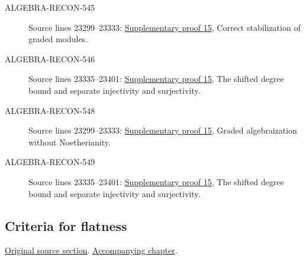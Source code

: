 \begin{description}
\item[ALGEBRA-RECON-545] Source lines 23299--23333: \hyperlink{algebra_graded_completion_notes_20260927}{Supplementary proof 15}, Correct stabilization of graded modules.
\item[ALGEBRA-RECON-546] Source lines 23335--23401: \hyperlink{algebra_graded_completion_notes_20260927}{Supplementary proof 15}, The shifted degree bound and separate injectivity and surjectivity.
\item[ALGEBRA-RECON-548] Source lines 23299--23333: \hyperlink{algebra_graded_completion_notes_20260927}{Supplementary proof 15}, Graded algebraization without Noetherianity.
\item[ALGEBRA-RECON-549] Source lines 23335--23401: \hyperlink{algebra_graded_completion_notes_20260927}{Supplementary proof 15}, The shifted degree bound and separate injectivity and surjectivity.
\end{description}

\subsection{Criteria for flatness}
\hypertarget{algebra-source-section-criteria-flatness}{}
\noindent\href{https://github.com/stacks/stacks-project/blob/a04446e57ec1fbc252a871afcec7752fb2807b14/algebra.tex\#L23415}{Original source section}. \href{algebra.pdf\#nameddest=section-criteria-flatness}{Accompanying chapter}.

